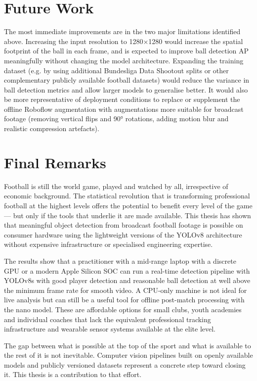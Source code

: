 \section{Future Work}

The most immediate improvements are in the two major limitations identified above. Increasing the input resolution to 1280×1280 would increase the spatial footprint of the ball in each frame, and is expected to improve ball detection AP meaningfully without changing the model architecture. Expanding the training dataset (e.g. by using additional Bundesliga Data Shootout splits or other complementary publicly available football datasets) would reduce the variance in ball detection metrics and allow larger models to generalise better. It would also be more representative of deployment conditions to replace or supplement the offline Roboflow augmentation with augmentations more suitable for broadcast footage (removing vertical flips and 90° rotations, adding motion blur and realistic compression artefacts).

\section{Final Remarks}

Football is still the world game, played and watched by all, irrespective of economic background. The statistical revolution that is transforming professional football at the highest levels offers the potential to benefit every level of the game — but only if the tools that underlie it are made available. This thesis has shown that meaningful object detection from broadcast football footage is possible on consumer hardware using the lightweight versions of the YOLOv8 architecture without expensive infrastructure or specialised engineering expertise.

The results show that a practitioner with a mid-range laptop with a discrete GPU or a modern Apple Silicon SOC can run a real-time detection pipeline with YOLOv8s with good player detection and reasonable ball detection at well above the minimum frame rate for smooth video. A CPU-only machine is not ideal for live analysis but can still be a useful tool for offline post-match processing with the nano model. These are affordable options for small clubs, youth academies and individual coaches that lack the equivalent professional tracking infrastructure and wearable sensor systems available at the elite level.

The gap between what is possible at the top of the sport and what is available to the rest of it is not inevitable. Computer vision pipelines built on openly available models and publicly versioned datasets represent a concrete step toward closing it. This thesis is a contribution to that effort.

